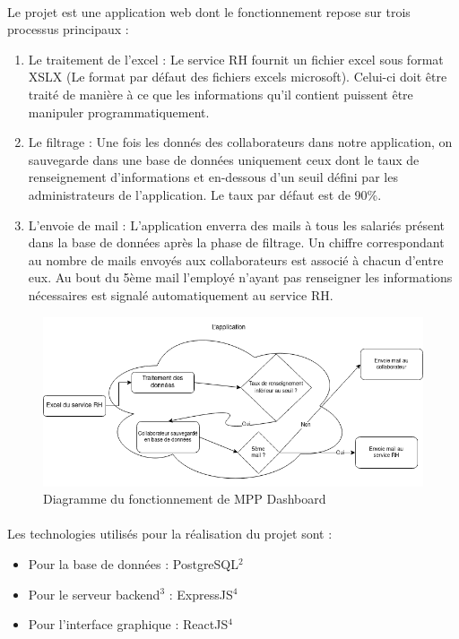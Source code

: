\documentclass[12pt]{article}
\begin{document}
\begin {sloppypar}
\paragraph {} 
Le projet est une application web dont le fonctionnement repose sur trois processus
principaux : 
\begin {enumerate}
  \item 
    Le traitement de l'excel : Le service RH fournit un fichier excel sous format XSLX 
    (Le format par défaut des fichiers excels microsoft). Celui-ci doit être traité de 
    manière à ce que les informations qu'il contient puissent être manipuler 
    programmatiquement.
  \item 
    Le filtrage : Une fois les donnés des collaborateurs dans notre application, on
    sauvegarde dans une base de données uniquement ceux dont le taux de renseignement 
    d'informations et en-dessous d'un seuil défini par les administrateurs de 
    l'application. Le taux par défaut est de 90\%. 
  \item 
    L'envoie de mail : L'application enverra des mails à tous les salariés présent 
    dans la base de données après la phase de filtrage. Un chiffre correspondant au nombre
    de mails envoyés aux collaborateurs est associé à chacun d'entre eux. Au bout du 
    5ème mail l'employé n'ayant pas renseigner les informations nécessaires est signalé 
    automatiquement au service RH.
\end{enumerate}
\newpage
\begin{figure}
  \includegraphics[width=\textwidth] {mpp-diagram.png}
  \caption {Diagramme du fonctionnement de MPP Dashboard}
\end{figure}
\paragraph {}
Les technologies utilisés pour la réalisation du projet sont : 
\begin {itemize}
\item   
  Pour la base de données : PostgreSQL$^{2}$ 
\item 
  Pour le serveur backend$^{3}$ : ExpressJS$^{4}$
\item 
  Pour l'interface graphique : ReactJS$^{4}$
\end {itemize}


\end{sloppypar}
\end{document}
